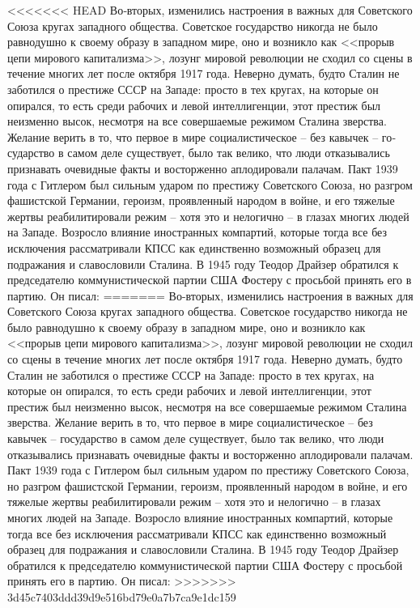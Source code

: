 \documentclass{book}
\begin{document}
{<<<<<<< HEAD
Во‑вторых, изменились настроения в важных для Советско­го Союза кругах западного общества. Советское государство никогда не было равнодушно к своему образу в западном ми­ре, оно и возникло как <<прорыв цепи мирового капитализма>>, лозунг мировой революции не сходил со сцены в течение многих лет после октября 1917 года. Неверно думать, будто Сталин не заботился о престиже СССР на Западе: просто в тех кругах, на которые он опирался, то есть среди рабочих и левой интел­лигенции, этот престиж был неизменно высок, несмотря на все совершаемые режимом Сталина зверства. Желание верить в то, что первое в мире социалистическое -- без кавычек -- го­сударство в самом деле существует, было так велико, что люди отказывались признавать очевидные факты и восторженно аплодировали палачам. Пакт 1939 года с Гитлером был силь­ным ударом по престижу Советского Союза, но разгром фа­шистской Германии, героизм, проявленный народом в войне, и его тяжелые жертвы реабилитировали режим -- хотя это и нелогично -- в глазах многих людей на Западе. Возросло вли­яние иностранных компартий, которые тогда все без исключения рассматривали КПСС как единственно возможный образец для подражания и славословили Сталина. В 1945 году Теодор Драйзер обратился к председателю коммунистической партии США Фостеру с просьбой принять его в партию. Он писал:
=======
Во-вторых, изменились настроения в важных для Советско­го Союза кругах западного общества. Советское государство никогда не было равнодушно к своему образу в западном ми­ре, оно и возникло как <<прорыв цепи мирового капитализма>>, лозунг мировой революции не сходил со сцены в течение многих лет после октября 1917 года. Неверно думать, будто Сталин не заботился о престиже СССР на Западе: просто в тех кругах, на которые он опирался, то есть среди рабочих и левой интел­лигенции, этот престиж был неизменно высок, несмотря на все совершаемые режимом Сталина зверства. Желание верить в то, что первое в мире социалистическое -- без кавычек -- го­сударство в самом деле существует, было так велико, что люди отказывались признавать очевидные факты и восторженно аплодировали палачам. Пакт 1939 года с Гитлером был силь­ным ударом по престижу Советского Союза, но разгром фа­шистской Германии, героизм, проявленный народом в войне, и его тяжелые жертвы реабилитировали режим -- хотя это и нелогично -- в глазах многих людей на 
Западе. Возросло вли­яние иностранных компартий, которые тогда все без исключения рассматривали КПСС как единственно возможный образец для подражания и славословили Сталина. В 1945 году Теодор Драйзер обратился к председателю коммунистической партии США Фостеру с просьбой принять его в партию. Он писал:
>>>>>>> 3d45c7403ddd39d9e516bd79e0a7b7ca9e1dc159

}
\end{document}
